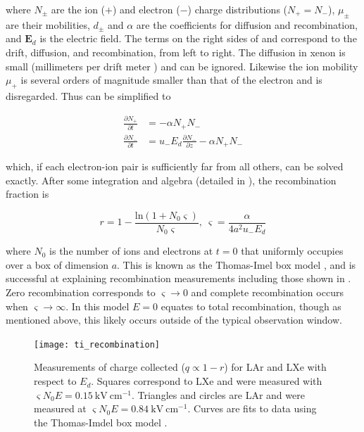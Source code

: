 \vspace{-15pt}

\noindent where $N_{\pm}$ are the ion ($+$) and electron ($-$) charge distributions ($N_+ = N_-$), $\mu_{\pm}$ are their mobilities,
$d_{\pm}$ and $\alpha$
are the coefficients for diffusion and recombination, and $\mathbf{E}_d$ is the electric field.  The terms on the right sides of
 and  correspond to the drift, diffusion, and recombination, from left to right.  The
diffusion in xenon is small (millimeters per drift meter ) and can be ignored.  Likewise the ion mobility $\mu_{+}$
is several orders of magnitude smaller than that
of the electron and is disregarded.  Thus  can be simplified to

\vspace{-20pt}

\begin{subequations}
\begin{align}
\frac{\partial N_{+}}{\partial t} &= - \alpha N_{+} N_{-}
\label{eq:diff_simple_plus} \\
\frac{\partial N_{-}}{\partial t} &= u_{-} E_d \frac{\partial N_{-}}{\partial z} - \alpha N_{+} N_{-}
\label{eq:diff_simple_minus}
\end{align}
\end{subequations}

\noindent which, if each electron-ion pair is sufficiently far from all others, can be solved exactly.  After some integration and algebra
(detailed in ), the recombination fraction is

\begin{equation}
r = 1 - \frac{\mathrm{ln} (1 + N_0 \varsigma)}{N_0 \varsigma},\ \varsigma = \frac{\alpha}{4 a^{2} u_{-} E_d}
\label{eq:ti_recomb}
\end{equation}

\noindent where $N_0$ is the number of ions and electrons at $t = 0$ that uniformly occupies over a box of dimension $a$.  This is known
as the Thomas-Imel box model ,
and is successful at explaining recombination measurements including those shown in .  Zero recombination
corresponds to
$\varsigma \rightarrow 0$ and complete recombination occurs when $\varsigma \rightarrow \infty$.  In this model $E = 0$ equates to total
recombination, though as mentioned above, this likely occurs outside of the typical observation window.

\begin{figure}
\texttt{[image: ti\_recombination]}
\caption[Measurements of charge collected ($q \propto 1 - r$) for LAr and LXe with respect to $E_d$.]{Measurements of charge collected
($q \propto 1 - r$) for LAr and LXe with respect to $E_d$.  Squares correspond to LXe and were
measured with $\varsigma N_0 E = 0.15\ \mathrm{kV\ cm^{-1}}$.  Triangles and circles are LAr and were measured at
$\varsigma N_0 E = 0.84\ \mathrm{kV\ cm^{-1}}$.  Curves are fits to data using the Thomas-Imdel box model .}
\label{fig:ti_recomb}
\end{figure}

